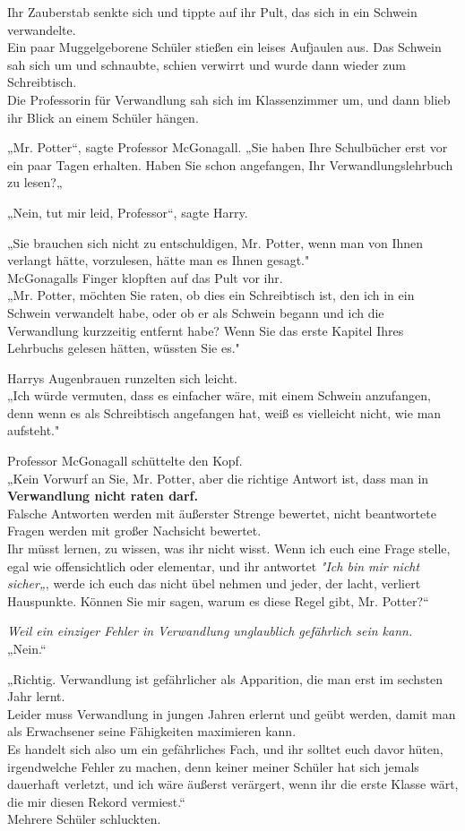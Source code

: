 {Ihr Zauberstab senkte sich und tippte auf ihr Pult, das sich in ein Schwein verwandelte.\\ Ein paar Muggelgeborene Schüler stießen ein leises Aufjaulen aus. Das Schwein sah sich um und schnaubte, schien verwirrt und wurde dann wieder zum Schreibtisch.\\ Die Professorin für Verwandlung sah sich im Klassenzimmer um, und dann blieb ihr Blick an einem Schüler hängen.

„Mr. Potter“, sagte Professor McGonagall. „Sie haben Ihre Schulbücher erst vor ein paar Tagen erhalten. Haben Sie schon angefangen, Ihr Verwandlungslehrbuch zu lesen?„

„Nein, tut mir leid, Professor“, sagte Harry.

„Sie brauchen sich nicht zu entschuldigen, Mr. Potter, wenn man von Ihnen verlangt hätte, vorzulesen, hätte man es Ihnen gesagt."\\ McGonagalls Finger klopften auf das Pult vor ihr.\\ „Mr. Potter, möchten Sie raten, ob dies ein Schreibtisch ist, den ich in ein Schwein verwandelt habe, oder ob er als Schwein begann und ich die Verwandlung kurzzeitig entfernt habe? Wenn Sie das erste Kapitel Ihres Lehrbuchs gelesen hätten, wüssten Sie es."

Harrys Augenbrauen runzelten sich leicht.\\ „Ich würde vermuten, dass es einfacher wäre, mit einem Schwein anzufangen, denn wenn es als Schreibtisch angefangen hat, weiß es vielleicht nicht, wie man aufsteht."

Professor McGonagall schüttelte den Kopf.\\ „Kein Vorwurf an Sie, Mr. Potter, aber die richtige Antwort ist, dass man in \textbf{Verwandlung nicht raten darf.}\\ Falsche Antworten werden mit äußerster Strenge bewertet, nicht beantwortete Fragen werden mit großer Nachsicht bewertet.\\ Ihr müsst lernen, zu wissen, was ihr nicht wisst. Wenn ich euch eine Frage stelle, egal wie offensichtlich oder elementar, und ihr antwortet \emph{"Ich bin mir nicht sicher„}, werde ich euch das nicht übel nehmen und jeder, der lacht, verliert Hauspunkte. Können Sie mir sagen, warum es diese Regel gibt, Mr. Potter?“

\emph{Weil ein einziger Fehler in Verwandlung unglaublich gefährlich sein kann.}\\ „Nein.“

„Richtig. Verwandlung ist gefährlicher als Apparition, die man erst im sechsten Jahr lernt.\\ Leider muss Verwandlung in jungen Jahren erlernt und geübt werden, damit man als Erwachsener seine Fähigkeiten maximieren kann.\\ Es handelt sich also um ein gefährliches Fach, und ihr solltet euch davor hüten, irgendwelche Fehler zu machen, denn keiner meiner Schüler hat sich jemals dauerhaft verletzt, und ich wäre äußerst verärgert, wenn ihr die erste Klasse wärt, die mir diesen Rekord vermiest.“\\ Mehrere Schüler schluckten.

}
